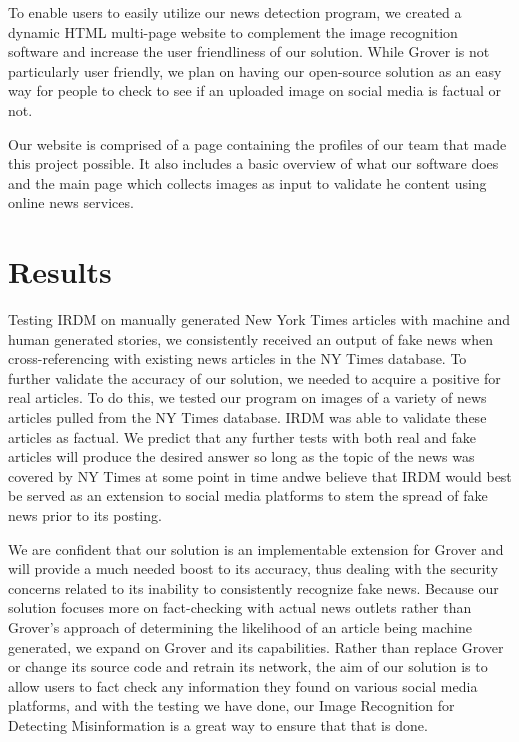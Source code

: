 \documentclass[conference]{IEEEtran}
\begin{document}
To enable users to easily utilize our news detection program, we created a dynamic HTML multi-page website to complement the image recognition software and increase the user friendliness of our solution. While Grover is not particularly user friendly, we plan on having our open-source solution as an easy way for people to check to see if an uploaded image on social media is factual or not.

Our website is comprised of a page containing the profiles of our team that made this project possible. It also includes a basic overview of what our software does and the main page which collects images as input to validate he content using online news services. 

\section{Results}

Testing IRDM on manually generated New York Times articles with machine and human generated stories, we consistently received an output of fake news when cross-referencing with existing news articles in the NY Times database. To further validate the accuracy of our solution, we needed to acquire a positive for real articles. To do this, we tested our program on images of a variety of news articles pulled from the NY Times database. IRDM was able to validate these articles as factual. We predict that any further tests with both real and fake articles will produce the desired answer so long as the topic of the news was covered by NY Times at some point in time andwe believe that IRDM would best be served as an extension to social media platforms to stem the spread of fake news prior to its posting.

We are confident that our solution is an implementable extension for Grover and will provide a much needed boost to its accuracy, thus dealing with the security concerns related to its inability to consistently recognize fake news. Because our solution focuses more on fact-checking with actual news outlets rather than Grover's approach of determining the likelihood of an article being machine generated, we expand on Grover and its capabilities. Rather than replace Grover or change its source code and retrain its network, the aim of our solution is to allow users to fact check any information they found on various social media platforms, and with the testing we have done, our Image Recognition for Detecting Misinformation is a great way to ensure that that is done.
\end{document}

